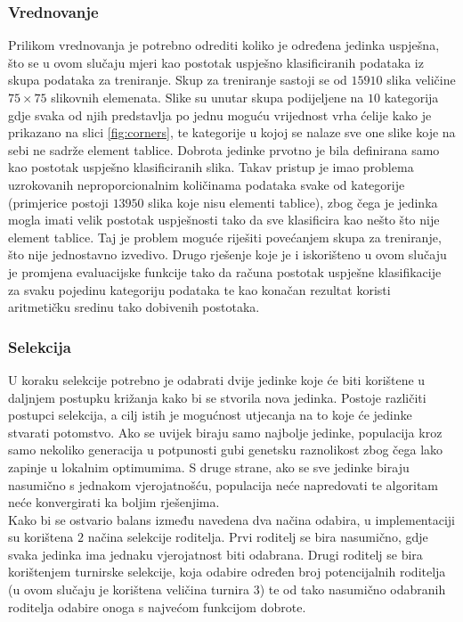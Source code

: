 \documentclass[times, utf8, zavrsni, numeric]{fer}
\begin{document}
\subsubsection{Vrednovanje}
Prilikom vrednovanja je potrebno odrediti koliko je određena jedinka uspješna, što se u ovom slučaju mjeri kao postotak uspješno klasificiranih podataka iz skupa podataka za treniranje.
Skup za treniranje sastoji se od $15910$ slika veličine $75\times 75$ slikovnih elemenata.
Slike su unutar skupa podijeljene na $10$ kategorija gdje svaka od njih predstavlja po jednu moguću vrijednost vrha ćelije kako je prikazano na slici \ref{fig:corners}, te kategorije u kojoj se nalaze sve one slike koje na sebi ne sadrže element tablice.
Dobrota jedinke prvotno je bila definirana samo kao postotak uspješno klasificiranih slika.
Takav pristup je imao problema uzrokovanih neproporcionalnim količinama podataka svake od kategorije (primjerice postoji $13950$ slika koje nisu elementi tablice), zbog čega je jedinka mogla imati velik postotak uspješnosti tako da sve klasificira kao nešto što nije element tablice.
Taj je problem moguće riješiti povećanjem skupa za treniranje, što nije jednostavno izvedivo.
Drugo rješenje koje je i iskorišteno u ovom slučaju je promjena evaluacijske funkcije tako da računa postotak uspješne klasifikacije za svaku pojedinu kategoriju podataka te kao konačan rezultat koristi aritmetičku sredinu tako dobivenih postotaka.
 
\subsubsection{Selekcija}
U koraku selekcije potrebno je odabrati dvije jedinke koje će biti korištene u daljnjem postupku križanja kako bi se stvorila nova jedinka.
Postoje različiti postupci selekcija, a cilj istih je mogućnost utjecanja na to koje će jedinke stvarati potomstvo. 
Ako se uvijek biraju samo najbolje jedinke, populacija kroz samo nekoliko generacija u potpunosti gubi genetsku raznolikost zbog čega lako zapinje u lokalnim optimumima.
S druge strane, ako se sve jedinke biraju nasumično s jednakom vjerojatnošću, populacija neće napredovati te algoritam neće konvergirati ka boljim rješenjima.\\
Kako bi se ostvario balans između navedena dva načina odabira, u implementaciji su korištena $2$ načina selekcije roditelja.
Prvi roditelj se bira nasumično, gdje svaka jedinka ima jednaku vjerojatnost biti odabrana.
Drugi roditelj se bira korištenjem turnirske selekcije, koja odabire određen broj potencijalnih roditelja (u ovom slučaju je korištena veličina turnira $3$) te od tako nasumično odabranih roditelja odabire onoga s najvećom funkcijom dobrote.
\end{document}
